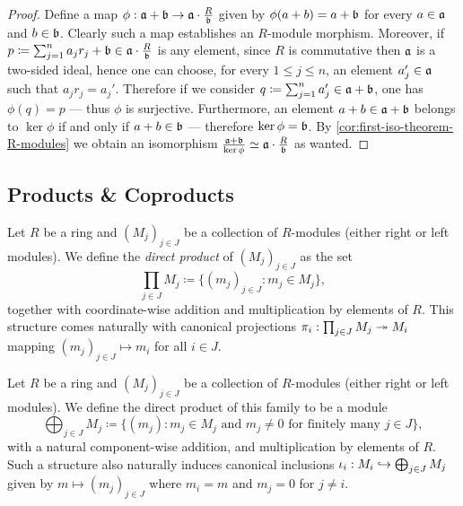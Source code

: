 \begin{proof}
Define a map
\(\phi: \mathfrak{a} + \mathfrak{b} \to \mathfrak{a} \cdot \frac{R}{\mathfrak{b}}\) given by
\(\phi(a + b) = a + \mathfrak{b}\) for every \(a \in \mathfrak{a}\) and
\(b \in \mathfrak{b}\). Clearly such a map establishes an \(R\)-module
morphism. Moreover, if
\(p \coloneq \sum_{j=1}^n a_j r_j + \mathfrak{b} \in \mathfrak{a} \cdot
\frac{R}{\mathfrak{b}}\) is any element, since \(R\) is commutative then
\(\mathfrak{a}\) is a two-sided ideal, hence one can choose, for every
\(1 \leq j \leq n\), an element \(a_j' \in \mathfrak{a}\) such that
\(a_j r_j = a_j'\). Therefore if we consider
\(q \coloneq \sum_{j=1}^n a_j' \in \mathfrak{a} + \mathfrak{b}\), one has
\(\phi(q) = p\) --- thus \(\phi\) is surjective. Furthermore, an element
\(a + b \in \mathfrak{a} + \mathfrak{b}\) belongs to \(\ker \phi\) if and only if
\(a + b \in \mathfrak{b}\) --- therefore \(\ker \phi = \mathfrak{b}\). By
\cref{cor:first-iso-theorem-R-modules} we obtain an isomorphism
\(\frac{\mathfrak{a} + \mathfrak{b}}{\ker \phi} \simeq \mathfrak{a} \cdot
\frac{R}{\mathfrak{b}}\) as wanted.
\end{proof}

\subsection{Products \& Coproducts}

\begin{definition}
\label{def:direct-product-modules}
Let \(R\) be a ring and \((M_j)_{j \in J}\) be a collection of \(R\)-modules
(either right or left modules). We define the \emph{direct product} of
\((M_j)_{j \in J}\) as the set
\[
\prod_{j \in J} M_j \coloneq \{(m_j)_{j \in J} \colon m_j \in M_j\},
\]
together with coordinate-wise addition and multiplication by elements of
\(R\). This structure comes naturally with canonical projections
\(\pi_i: \prod_{j \in J} M_j \twoheadrightarrow M_i\) mapping \((m_j)_{j \in J} \mapsto m_i\)
for all \(i \in J\).
\end{definition}

\begin{definition}
\label{def:direct-sum-modules}
Let \(R\) be a ring and \((M_j)_{j \in J}\) be a collection of \(R\)-modules
(either right or left modules). We define the direct product of this family to
be a module
\[
\bigoplus_{j \in J} M_j \coloneq
\{(m_j) \colon m_j \in M_j \text{ and } m_j \neq 0
\text{ for finitely many } j \in J\},
\]
with a natural component-wise addition, and multiplication by elements of
\(R\). Such a structure also naturally induces canonical inclusions \(\iota_i:
M_i \hookrightarrow \bigoplus_{j \in J} M_j\) given by \(m \mapsto (m_j)_{j \in J}\)
where \(m_i = m\) and \(m_j = 0\) for \(j \neq i\).
\end{definition}

